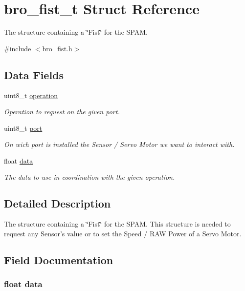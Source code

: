 \hypertarget{structbro__fist__t}{
\section{bro\_\-fist\_\-t Struct Reference}
\label{structbro__fist__t}
}


The structure containing a \char`\"{}Fist\char`\"{} for the SPAM.  




{\ttfamily \#include $<$bro\_\-fist.h$>$}

\subsection*{Data Fields}
\begin{DoxyCompactItemize}
\item 
uint8\_\-t \hyperlink{structbro__fist__t_a97d486d6926f9137837e1d8ecf0bbfdd}{operation}
\begin{DoxyCompactList}\small\item\em Operation to request on the given port. \item\end{DoxyCompactList}\item 
uint8\_\-t \hyperlink{structbro__fist__t_a2fa54f9024782843172506fadbee2ac8}{port}
\begin{DoxyCompactList}\small\item\em On wich port is installed the Sensor / Servo Motor we want to interact with. \item\end{DoxyCompactList}\item 
float \hyperlink{structbro__fist__t_a173b91873a3fc4f50a95416a6204d963}{data}
\begin{DoxyCompactList}\small\item\em The data to use in coordination with the given operation. \item\end{DoxyCompactList}\end{DoxyCompactItemize}


\subsection{Detailed Description}
The structure containing a \char`\"{}Fist\char`\"{} for the SPAM. This structure is needed to request any Sensor's value or to set the Speed / RAW Power of a Servo Motor. 

\subsection{Field Documentation}
\hypertarget{structbro__fist__t_a173b91873a3fc4f50a95416a6204d963}{
\subsubsection[{data}]{\setlength{\rightskip}{0pt plus 5cm}float {\bf data}}}
\label{structbro__fist__t_a173b91873a3fc4f50a95416a6204d963}


